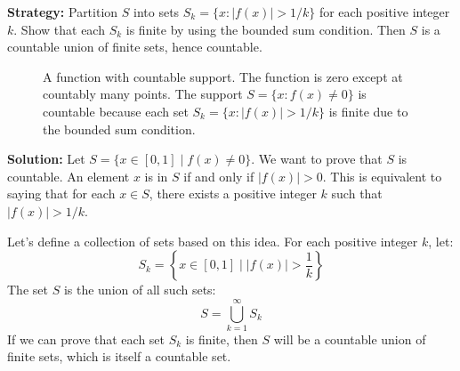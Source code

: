 \noindent\textbf{Strategy:} Partition $S$ into sets $S_k = \{x : |f(x)| > 1/k\}$ for each positive integer $k$. Show that each $S_k$ is finite by using the bounded sum condition. Then $S$ is a countable union of finite sets, hence countable.

\begin{figure}[h]
\centering
{}
\caption{A function with countable support. The function is zero except at countably many points. The support $S = \{x : f(x) \neq 0\}$ is countable because each set $S_k = \{x : |f(x)| > 1/k\}$ is finite due to the bounded sum condition.}
\end{figure}

\bigskip\noindent\textbf{Solution:}  
Let $S = \{x \in [0,1] \mid f(x) \ne 0\}$. We want to prove that $S$ is countable.
An element $x$ is in $S$ if and only if $|f(x)| > 0$.
This is equivalent to saying that for each $x \in S$, there exists a positive integer $k$ such that $|f(x)| > 1/k$.

Let's define a collection of sets based on this idea. For each positive integer $k$, let:
\[ S_k = \left\{ x \in [0,1] \mid |f(x)| > \frac{1}{k} \right\} \]
The set $S$ is the union of all such sets:
\[ S = \bigcup_{k=1}^{\infty} S_k \]
If we can prove that each set $S_k$ is finite, then $S$ will be a countable union of finite sets, which is itself a countable set.

